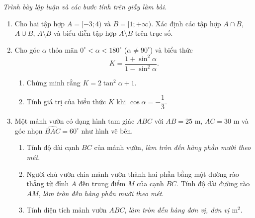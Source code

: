 \documentclass[12pt,a4paper]{article}
\newcommand{\parttitle}[1]{\par\vspace{3pt}{\large\bfseries\color{ink}#1}\par\vspace{2pt}}
\begin{document}
\par\vspace{8pt}
\parttitle{PHẦN IV. Tự luận}
\textit{Trình bày lập luận và các bước tính trên giấy làm bài.}
\begin{enumerate}
\item Cho hai tập hợp $A = [-3; 4)$ và $B = [1; +\infty)$.
Xác định các tập hợp $A \cap B$, $A \cup B$, $A \setminus B$ và biểu diễn tập hợp $A \setminus B$ trên trục số.
\item Cho góc $\alpha$ thỏa mãn $0^\circ < \alpha < 180^\circ$ ($\alpha \neq 90^\circ$) và biểu thức
\[
K = \frac{1 + \sin^2\alpha}{1 - \sin^2\alpha}.
\]
\begin{enumerate}
\item Chứng minh rằng $K = 2\tan^2\alpha + 1$.
\item Tính giá trị của biểu thức $K$ khi $\cos\alpha = -\dfrac{1}{3}$.
\end{enumerate}
\item \begin{minipage}[t]{0.56\linewidth}
Một mảnh vườn có dạng hình tam giác $ABC$ với $AB = 25\text{ m}$, $AC = 30\text{ m}$ và góc nhọn $\widehat{BAC} = 60^\circ$ như hình vẽ bên.
\begin{enumerate}
\item Tính độ dài cạnh $BC$ của mảnh vườn, \textit{làm tròn đến hàng phần mười theo mét}.
\item Người chủ vườn chia mảnh vườn thành hai phần bằng một đường rào thẳng từ đỉnh $A$ đến trung điểm $M$ của cạnh $BC$. Tính độ dài đường rào $AM$, \textit{làm tròn đến hàng phần mười theo mét}.
\item Tính diện tích mảnh vườn $ABC$, \textit{làm tròn đến hàng đơn vị, đơn vị $\mathrm{m}^2$}.
\end{enumerate}
\end{minipage}\hfill%
\begin{minipage}[t]{0.42\linewidth}
\vspace{-0.3\baselineskip}
\centering
{}
\end{minipage}
\end{enumerate}
\end{document}
